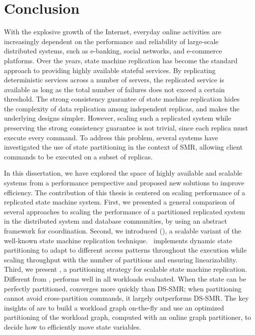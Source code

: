 \chapter[Conclusion]{Conclusion}

With the explosive growth of the Internet, everyday online activities are
increasingly dependent on the performance and reliability of large-scale
distributed systems, such as e-banking, social networks, and e-commerce
platforms. Over the years, state machine replication has become the 
standard approach to providing highly available stateful services. By
replicating deterministic services across a number of servers, the replicated
service is available as long as the total number of failures does not exceed a
certain threshold. The strong consistency guarantee of state machine replication
hides the complexity of data replication among independent replicas, and makes the
underlying designs simpler. However, scaling such a replicated system while
preserving the strong consistency guarantee is not trivial, since each replica
must execute every command. To address this problem, several systems have
investigated the use of state partitioning in the context of SMR, allowing
client commands to be executed on a subset of replicas. 

In this dissertation, we have explored the space of highly available
and scalable systems from a performance perspective and proposed new solutions
to improve efficiency. The contribution of this thesis is centered on
scaling performance of a replicated state machine system. First, we presented a
general comparison of several approaches to scaling the performance of a
partitioned replicated system in the distributed system and database
communities, by using an abstract framework for coordination. Second, we
introduced \dssmrlong{} (\dssmr), a scalable variant of the well-known state
machine replication technique. \dssmr\ implements dynamic state partitioning to
adapt to different access patterns throughout the execution while scaling
throughput with the number of partitions and ensuring linearizability. Third, we
present \dynastar, a partitioning strategy for scalable state machine
replication. Different from \dssmr{}, \dynastar performs well in all workloads
evaluated. When the state can be perfectly partitioned, \dynastar converges more
quickly than DS-SMR; when partitioning cannot avoid cross-partition commands, it
largely outperforms DS-SMR. The key insights of \dynastar are to build a
workload graph on-the-fly and use an optimized partitioning of the workload
graph, computed with an online graph partitioner, to decide how to efficiently
move state variables. 

